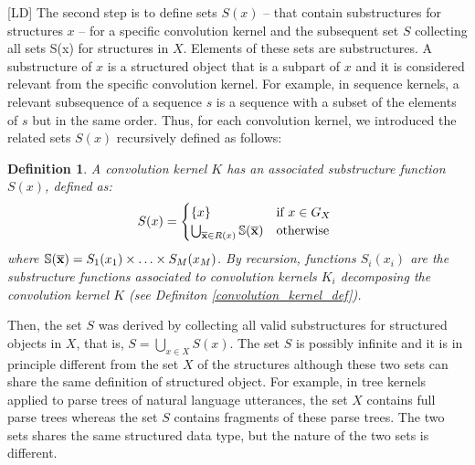 \documentclass[twoside,11pt]{article}
\newtheorem{definition}{Definition}
\def\substr#1{{\bf\overline{#1}}}
\def\finalsecondcomment#1#2{}
\def\mysecondremove#1{}
\def\mysecondinsert#1{#1}
\def\LD#1{[{\color{blue}L}D] {\color{blue}#1}}
\begin{document}
\LD{The second step is to define sets $S(x)$ -- that contain substructures for structures $x$ -- for a specific convolution kernel and the subsequent set $S$ collecting all sets S(x) for structures in $X$.} Elements of these sets are substructures. 
A substructure of $x$ is a structured object that is a subpart of $x$ and it is considered relevant from the specific convolution kernel. For example, in sequence kernels, a relevant subsequence of a sequence $s$ is a sequence with a subset of the elements of $s$ but in the same order. Thus, for each convolution kernel,  we introduced the related sets $S(x)$ recursively defined as follows:
\begin{definition}
\label{substructure_function}
A convolution kernel \mysecondinsert{$K$} has an associated substructure function $S(x)$, defined as:
\begin{equation}
 S(x) = 
\begin{cases}
\mysecondinsert{\{x\}} & \mbox{if \mysecondinsert{$x\in G_X$} \mysecondremove{is a terminal object}}\\
 \bigcup_{\substr{x} \in R(x)} {\mathbb S}(\substr{x}) & \mbox{otherwise}
\end{cases}
\end{equation}
where ${\mathbb S}(\substr{x}) = S_1(x_1) \times  \ldots \times S_M(x_M)$. \mysecondremove{Functions $S_i$ are recursively induced by kernels $K_i$.} \mysecondinsert{By recursion, functions $S_i(x_i)$ are the substructure functions associated to convolution kernels $K_i$ decomposing the convolution kernel $K$ (see Definiton \ref{convolution_kernel_def}).}
\finalsecondcomment{R3.7}{Definition 7: "Functions $S_i$" are not defined. What are the input and output spaces of each of these functions? Because S(x) = x if x is in $G_X$, it seems S is a function from $G_X \rightarrow G_X$. On the other hand, it seems that S functions might be set valued, in which case S(x) should be $\{x\}$.}
\finalsecondcomment{R3.8}{"Functions Si are recursively induced by kernels Ki." I do not understand the meaning of this statement.}
\end{definition}
Then, the set $S$ was derived by collecting all valid substructures for structured objects in $X$, that is,  $S = \bigcup_{x \in X} S(x)$. The set $S$ is possibly infinite
and it is in principle different from the set $X$ of the structures although these two sets can share the same definition of structured object. For example, in tree kernels \cite{Collins2002} applied to parse trees of natural language utterances, the set $X$ contains full parse trees whereas the set $S$ contains fragments of these parse trees. The two sets shares the same structured data type, but the nature of the two sets is different.  
\end{document}
